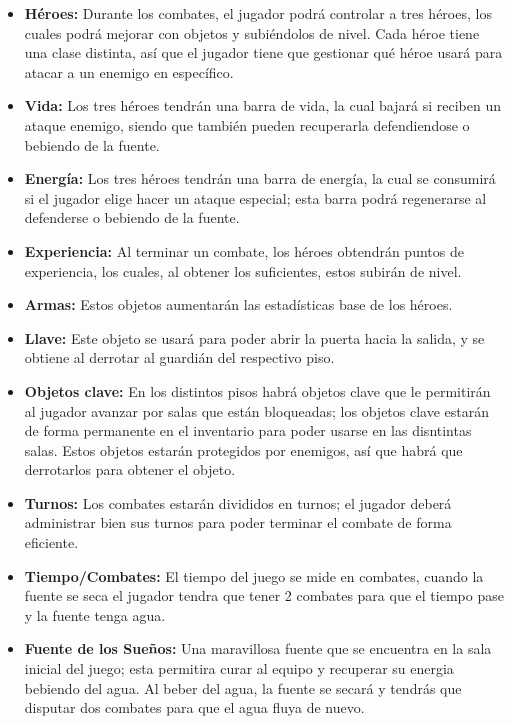 \begin{itemize}
    \item \textbf{Héroes:} Durante los combates, el jugador podrá controlar a tres héroes, los cuales podrá mejorar con objetos y subiéndolos de nivel. Cada héroe tiene una clase distinta, así que el jugador tiene que gestionar qué héroe usará para atacar a un enemigo en específico.
    
    \item \textbf{Vida:} Los tres héroes tendrán una barra de vida, la cual bajará si reciben un ataque enemigo, siendo que también pueden recuperarla defendiendose o bebiendo de la fuente.

    \item \textbf{Energía:} Los tres héroes tendrán una barra de energía, la cual se consumirá si el jugador elige hacer un ataque especial; esta barra podrá regenerarse al defenderse o bebiendo de la fuente.

    \item \textbf{Experiencia:} Al terminar un combate, los héroes obtendrán puntos de experiencia, los cuales, al obtener los suficientes, estos subirán de nivel.

    \item \textbf{Armas:} Estos objetos aumentarán las estadísticas base de los héroes.

    \item \textbf{Llave:} Este objeto se usará para poder abrir la puerta hacia la salida, y se obtiene al derrotar al guardián del respectivo piso.

    \item \textbf{Objetos clave:} En los distintos pisos habrá objetos clave que le permitirán al jugador avanzar por salas que están bloqueadas; los objetos clave estarán de forma permanente en el inventario para poder usarse en las disntintas salas. Estos objetos estarán protegidos por enemigos, así que habrá que derrotarlos para obtener el objeto.

    \item \textbf{Turnos:} Los combates estarán divididos en turnos; el jugador deberá administrar bien sus turnos para poder terminar el combate de forma eficiente.

    \item \textbf{Tiempo/Combates:} El tiempo del juego se mide en combates, cuando la fuente se seca el jugador tendra que tener 2 combates para que el tiempo pase y la fuente tenga agua.

    \item \textbf{Fuente de los Sueños:} Una maravillosa fuente que se encuentra en la sala inicial del juego; esta permitira curar al equipo  y recuperar su energia bebiendo del agua. Al beber del agua, la fuente se secará y tendrás que disputar dos combates para que el agua fluya de nuevo.
\end{itemize}

